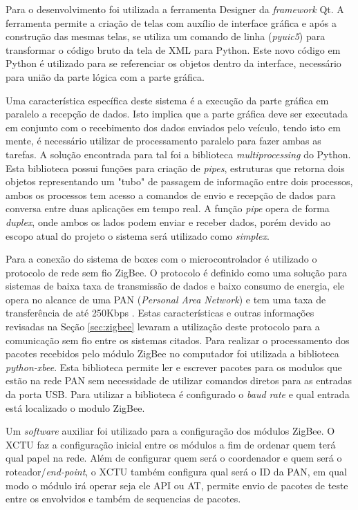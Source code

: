 Para o desenvolvimento foi utilizada a ferramenta Designer da \textit{framework} Qt. A ferramenta permite a criação de telas com auxílio de interface gráfica e após a construção das mesmas telas, se utiliza um comando de linha (\textit{pyuic5}) para transformar o código bruto da tela de XML para Python. Este novo código em Python é utilizado para se referenciar os objetos dentro da interface, necessário para união da parte lógica com a parte gráfica.

Uma característica específica deste sistema é a execução da parte gráfica em paralelo a recepção de dados. Isto implica que a parte gráfica deve ser executada em conjunto com o recebimento dos dados enviados pelo veículo, tendo isto em mente, é necessário utilizar de processamento paralelo para fazer ambas as tarefas. A solução encontrada para tal foi a biblioteca \textit{multiprocessing} do Python. Esta biblioteca possui funções para criação de \textit{pipes}, estruturas que retorna dois objetos representando um "tubo" de passagem de informação entre dois processos, ambos os processos tem acesso a comandos de envio e recepção de dados para conversa entre duas aplicações em tempo real. A função \textit{pipe} opera de forma \textit{duplex}, onde ambos os lados podem enviar e receber dados, porém devido ao escopo atual do projeto o sistema será utilizado como \textit{simplex}.    

Para a conexão do sistema de boxes com o microcontrolador é utilizado o protocolo de rede sem fio ZigBee. O protocolo é definido como uma solução para sistemas de baixa taxa de transmissão de dados e baixo consumo de energia, ele opera no alcance de uma PAN (\textit{Personal Area Network}) e tem uma taxa de transferência de até 250Kbps \cite{elahi2009zigbee}. Estas características e outras informações revisadas na Seção \ref{sec:zigbee} levaram a utilização deste protocolo para a comunicação sem fio entre os sistemas citados. Para realizar o processamento dos pacotes recebidos pelo módulo ZigBee no computador foi utilizada a biblioteca \textit{python-xbee}. Esta biblioteca permite ler e escrever pacotes para os modulos que estão na rede PAN sem necessidade de utilizar comandos diretos para as entradas da porta USB. Para utilizar a biblioteca é configurado o \textit{baud rate} e qual entrada está localizado o modulo ZigBee. 

Um \textit{software} auxiliar foi utilizado para a configuração dos módulos ZigBee. O XCTU faz a configuração inicial entre os módulos a fim de ordenar quem terá qual papel na rede. Além de configurar quem será o coordenador e quem será o roteador/\textit{end-point}, o XCTU também configura qual será o ID da PAN, em qual modo o módulo irá operar seja ele API ou AT, permite envio de pacotes de teste entre os envolvidos e também de sequencias de pacotes. 

